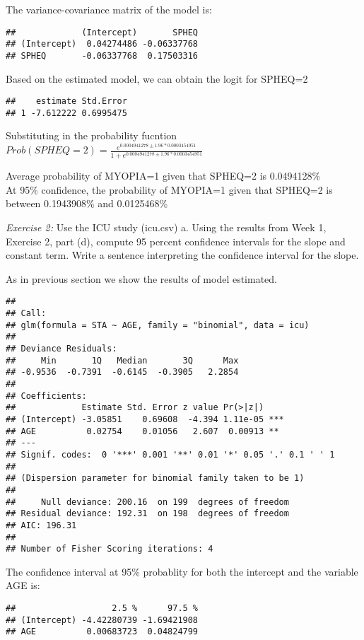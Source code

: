 \documentclass[]{article}
\begin{document}
The variance-covariance matrix of the model is:

\begin{verbatim}
##             (Intercept)       SPHEQ
## (Intercept)  0.04274486 -0.06337768
## SPHEQ       -0.06337768  0.17503316
\end{verbatim}

Based on the estimated model, we can obtain the logit for SPHEQ=2

\begin{verbatim}
##    estimate Std.Error
## 1 -7.612222 0.6995475
\end{verbatim}

Substituting in the probability fucntion
$Prob(SPHEQ=2)=\frac{e^{0.0004941278\pm1.96*0.0003454951}}{1+e^{0.0004941278\pm1.96*0.0003454951}}$

Average probability of MYOPIA=1 given that SPHEQ=2 is 0.0494128\%\\At
95\% confidence, the probability of MYOPIA=1 given that SPHEQ=2 is
between 0.1943908\% and 0.0125468\%

\emph{Exercise 2:} Use the ICU study (icu.csv) a. Using the results from
Week 1, Exercise 2, part (d), compute 95 percent confidence intervals
for the slope and constant term. Write a sentence interpreting the
confidence interval for the slope.

As in previous section we show the results of model estimated.

\begin{verbatim}
## 
## Call:
## glm(formula = STA ~ AGE, family = "binomial", data = icu)
## 
## Deviance Residuals: 
##     Min       1Q   Median       3Q      Max  
## -0.9536  -0.7391  -0.6145  -0.3905   2.2854  
## 
## Coefficients:
##             Estimate Std. Error z value Pr(>|z|)    
## (Intercept) -3.05851    0.69608  -4.394 1.11e-05 ***
## AGE          0.02754    0.01056   2.607  0.00913 ** 
## ---
## Signif. codes:  0 '***' 0.001 '**' 0.01 '*' 0.05 '.' 0.1 ' ' 1
## 
## (Dispersion parameter for binomial family taken to be 1)
## 
##     Null deviance: 200.16  on 199  degrees of freedom
## Residual deviance: 192.31  on 198  degrees of freedom
## AIC: 196.31
## 
## Number of Fisher Scoring iterations: 4
\end{verbatim}

The confidence interval at 95\% probablity for both the intercept and
the variable AGE is:

\begin{verbatim}
##                   2.5 %      97.5 %
## (Intercept) -4.42280739 -1.69421908
## AGE          0.00683723  0.04824799
\end{verbatim}
\end{document}
